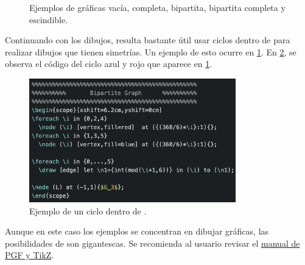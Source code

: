 \begin{figure}[ht!]
\caption{Ejemplos de gr\'aficas vac\'ia, completa, bipartita, bipartita completa
y escindible.}
\label{fig:fam1}
\end{figure}

Continuando con los dibujos, resulta bastante \'util usar ciclos 
dentro de  para realizar dibujos que tienen simetr\'ias.   Un ejemplo
de esto ocurre en \cref{fig:fam1}.   En \cref{fig:tikzFor}, se observa el
c\'odigo del ciclo azul y rojo que aparece en \cref{fig:fam1}.

\begin{figure}[ht!]
  \centering
  \includegraphics[width=0.8\textwidth]{recursos/capturas/tikzfor}
  \caption{Ejemplo de un ciclo  dentro de .}
  \label{fig:tikzFor}
\end{figure}

Aunque en este caso los ejemplos se concentran en dibujar gr\'aficas, las
posibilidades de  son gigantescas.   Se recomienda al usuario revisar
el \href{https://mirror.las.iastate.edu/tex-archive/graphics/pgf/base/doc/%
pgfmanual.pdf}{manual de PGF y TikZ}.


